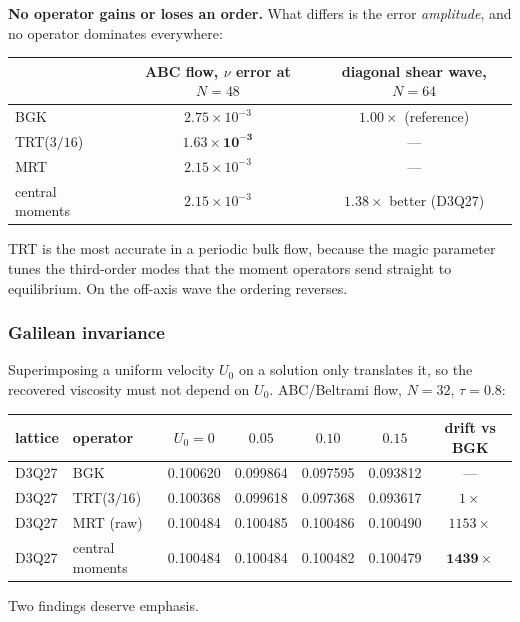 \documentclass[11pt,a4paper]{article}
\begin{document}
\noindent \textbf{No operator gains or loses an order.} What differs is the error
\emph{amplitude}, and no operator dominates everywhere:

\begin{center}\small
\begin{tabular}{lcc}
\toprule
 & ABC flow, $\nu$ error at $N=48$ & diagonal shear wave, $N=64$ \\
\midrule
BGK & $2.75\times10^{-3}$ & $1.00\times$ (reference) \\
TRT($3/16$) & $\bm{1.63\times10^{-3}}$ & --- \\
MRT & $2.15\times10^{-3}$ & --- \\
central moments & $2.15\times10^{-3}$ & $\bm{1.38\times}$ better (D3Q27) \\
\bottomrule
\end{tabular}
\end{center}

\noindent TRT is the most accurate in a periodic bulk flow, because the magic
parameter tunes the third-order modes that the moment operators send straight to
equilibrium. On the off-axis wave the ordering reverses.
\subsubsection{Galilean invariance}
\label{sec:galilean}

Superimposing a uniform velocity $U_0$ on a solution only translates it, so the
recovered viscosity must not depend on $U_0$. ABC/Beltrami flow, $N=32$,
$\tau=0.8$:

\begin{center}\small
\begin{tabular}{llccccc}
\toprule
lattice & operator & $U_0{=}0$ & $0.05$ & $0.10$ & $0.15$ & drift vs BGK \\
\midrule
D3Q27 & BGK             & 0.100620 & 0.099864 & 0.097595 & 0.093812 & --- \\
D3Q27 & TRT($3/16$)     & 0.100368 & 0.099618 & 0.097368 & 0.093617 & $1\times$ \\
D3Q27 & MRT (raw)       & 0.100484 & 0.100485 & 0.100486 & 0.100490 & $1153\times$ \\
D3Q27 & central moments & 0.100484 & 0.100484 & 0.100482 & 0.100479 & $\bm{1439\times}$ \\
\bottomrule
\end{tabular}
\end{center}

Two findings deserve emphasis.
\end{document}

